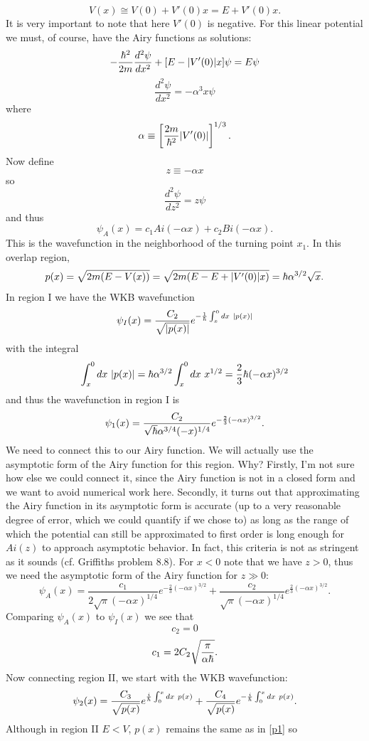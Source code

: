 \documentclass[11pt,letterpaper]{article}
\begin{document}
\begin{enumerate}
\begin{enumerate}
$$V(x) \cong V(0)+V'(0)x = E+V'(0)x.$$
It is very important to note that here $V'(0)$ is negative. For this linear potential we must, of course, have the Airy functions as solutions:
$$-\frac{\hbar^2}{2m}\frac{d^2\psi}{dx^2}+[E-|V'(0)|x]\psi = E\psi$$
$$\frac{d^2\psi}{dx^2} = -\alpha^3x\psi$$
where
$$\alpha \equiv \left[\frac{2m}{\hbar^2}|V'(0)|\right]^{1/3}.$$
Now define 
$$z\equiv -\alpha x$$
so
$$\frac{d^2\psi}{dz^2} = z\psi$$
and thus
$$\psi_A(x) = c_1Ai(-\alpha x)+c_2Bi(-\alpha x).$$
This is the wavefunction in the neighborhood of the turning point $x_1$. In this overlap region,
\begin{equation}\label{p1}p(x) = \sqrt{2m(E-V(x))} = \sqrt{2m(E-E+|V'(0)|x)} = \hbar\alpha^{3/2}\sqrt{x}.\end{equation}
In region I we have the WKB wavefunction
$$\psi_I(x) =\frac{C_2}{\sqrt{|p(x)|}}e^{-\frac{1}{\hbar}\int_x^{0}{dx\  |p(x)|}}$$
with the integral
$$\int_x^{0}{dx\ |p(x)|} = \hbar\alpha^{3/2}\int_x^{0}{dx\ x^{1/2}} = \frac{2}{3}\hbar(-\alpha x)^{3/2}$$
and thus the wavefunction in region I is 
$$\psi_1(x) = \frac{C_2}{\sqrt{\hbar}\alpha^{3/4}(-x)^{1/4}}e^{-\frac{2}{3}(-\alpha x)^{3/2}}.$$
We need to connect this to our Airy function. We will actually use the asymptotic form of the Airy function for this region. Why? Firstly, I'm not sure how else we could connect it, since the Airy function is not in a closed form and we want to avoid numerical work here. Secondly, it turns out that approximating the Airy function in its asymptotic form is accurate (up to a very reasonable degree of error, which we could quantify if we chose to) as long as the range of which the potential can still be approximated to first order is long enough for $Ai(z)$ to approach asymptotic behavior. In fact, this criteria is not as stringent as it sounds (cf. Griffiths problem 8.8). For $x<0$ note that we have $z>0$, thus we need the asymptotic form of the Airy function for $z\gg0$:
$$\psi_A(x) = \frac{c_1}{2\sqrt\pi (-\alpha x)^{1/4}}e^{-\frac{2}{3}(-\alpha x)^{3/2}}+\frac{c_2}{\sqrt\pi (-\alpha x)^{1/4}}e^{\frac{2}{3}(-\alpha x)^{3/2}}.$$
Comparing $\psi_A(x)$ to $\psi_I(x)$ we see that
 $$c_2 = 0$$ 
 \begin{equation}\label{c_1}c_1 = 2C_2\sqrt{\frac{\pi}{\alpha\hbar}}.\end{equation}
 Now connecting region II, we start with the WKB wavefunction:
 $$\psi_{2}(x) = \frac{C_3}{\sqrt{p(x)}}e^{\frac{i}{\hbar}\int_{0}^x{dx\  p(x)}}+\frac{C_4}{\sqrt{p(x)}}e^{-\frac{i}{\hbar}\int_{0}^x{dx\  p(x)}}.$$
Although in region II $E<V$, $p(x)$ remains the same as in \eqref{p1} so

\end{enumerate}
\end{enumerate}
\end{document}
